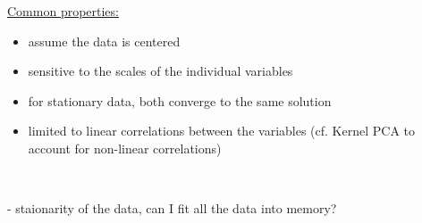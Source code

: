 \begin{frame}\frametitle{\secname}

\underline{Common properties:}

\begin{itemize}
\item assume the data is centered
\item sensitive to the scales of the individual variables
\item for stationary data, both converge to the same solution
\item limited to linear correlations between the variables (cf. Kernel PCA to account for non-linear correlations)
\end{itemize}

\pause

\\


\pause

- staionarity of the data, can I fit all the data into memory?


\end{frame}
